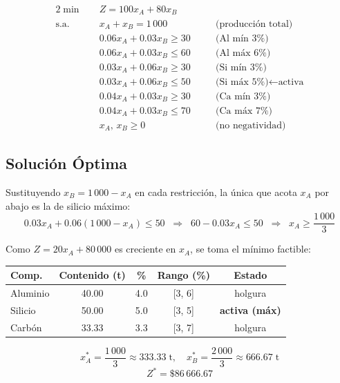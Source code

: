 \documentclass[12pt,a4paper]{article}
\begin{document}
\begin{modelbox}
\begin{alignat*}{2}
  \min\quad & Z = 100x_A + 80x_B\\[4pt]
  \text{s.a.}\quad
  & x_A + x_B = 1\,000 &\quad& \text{(producción total)}\\
  & 0.06x_A + 0.03x_B \geq 30 &\quad& \text{(Al mín 3\%)}\\
  & 0.06x_A + 0.03x_B \leq 60 &\quad& \text{(Al máx 6\%)}\\
  & 0.03x_A + 0.06x_B \geq 30 &\quad& \text{(Si mín 3\%)}\\
  & 0.03x_A + 0.06x_B \leq 50 &\quad& \text{(Si máx 5\%)} \leftarrow\text{activa}\\
  & 0.04x_A + 0.03x_B \geq 30 &\quad& \text{(Ca mín 3\%)}\\
  & 0.04x_A + 0.03x_B \leq 70 &\quad& \text{(Ca máx 7\%)}\\
  & x_A,\, x_B \geq 0         &\quad& \text{(no negatividad)}
\end{alignat*}
\end{modelbox}

\subsection{Solución Óptima}

Sustituyendo $x_B = 1\,000 - x_A$ en cada restricción, la única que acota $x_A$ por abajo
es la de silicio máximo:
\[
  0.03x_A + 0.06(1\,000-x_A) \leq 50
  \;\;\Rightarrow\;\;
  60 - 0.03x_A \leq 50
  \;\;\Rightarrow\;\;
  x_A \geq \frac{1\,000}{3}
\]

Como $Z = 20x_A + 80\,000$ es creciente en $x_A$, se toma el mínimo factible:

\begin{center}
\renewcommand{\arraystretch}{1.3}
\begin{tabular}{@{}lcccc@{}}
\toprule
\textbf{Comp.} & \textbf{Contenido (t)} & \textbf{\%} & \textbf{Rango (\%)} & \textbf{Estado}\\
\midrule
Aluminio & 40.00 & 4.0 & [3, 6] & holgura\\
Silicio  & 50.00 & 5.0 & [3, 5] & \textbf{activa (máx)}\\
Carbón   & 33.33 & 3.3 & [3, 7] & holgura\\
\bottomrule
\end{tabular}
\end{center}

\begin{solucbox}
\[
  x_A^* = \frac{1\,000}{3} \approx 333.33\;\text{t},\quad
  x_B^* = \frac{2\,000}{3} \approx 666.67\;\text{t}
\]
\[
  \boxed{Z^* = \$86\,666.67}
\]
\end{solucbox}
\end{document}
